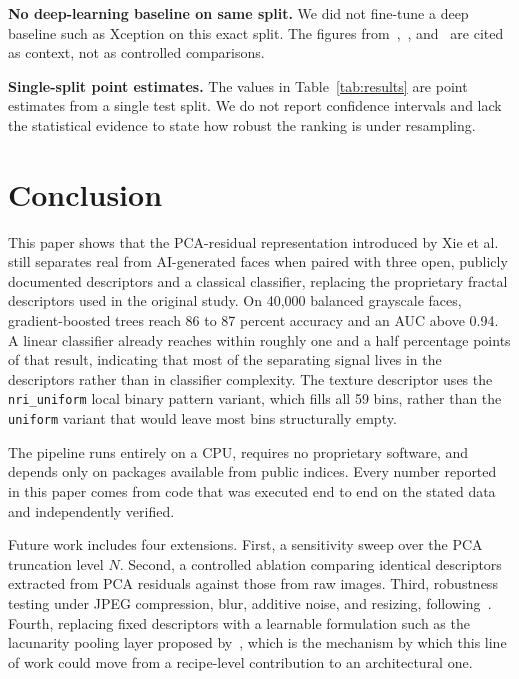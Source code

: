 \documentclass[runningheads]{llncs}
\begin{document}
\textbf{No deep-learning baseline on same split.} We did not fine-tune a deep baseline such as Xception on this exact split. The figures from~\cite{rossler2019},~\cite{yasir2025}, and~\cite{nirob2026} are cited as context, not as controlled comparisons.

\textbf{Single-split point estimates.} The values in Table~\ref{tab:results} are point estimates from a single test split. We do not report confidence intervals and lack the statistical evidence to state how robust the ranking is under resampling.


\section{Conclusion}

This paper shows that the PCA-residual representation introduced by Xie et al.~\cite{xie2026} still separates real from AI-generated faces when paired with three open, publicly documented descriptors and a classical classifier, replacing the proprietary fractal descriptors used in the original study. On 40,000 balanced grayscale faces, gradient-boosted trees reach 86 to 87 percent accuracy and an AUC above 0.94. A linear classifier already reaches within roughly one and a half percentage points of that result, indicating that most of the separating signal lives in the descriptors rather than in classifier complexity. The texture descriptor uses the \texttt{nri\_uniform} local binary pattern variant, which fills all 59 bins, rather than the \texttt{uniform} variant that would leave most bins structurally empty.

The pipeline runs entirely on a CPU, requires no proprietary software, and depends only on packages available from public indices. Every number reported in this paper comes from code that was executed end to end on the stated data and independently verified.

Future work includes four extensions. First, a sensitivity sweep over the PCA truncation level $N$. Second, a controlled ablation comparing identical descriptors extracted from PCA residuals against those from raw images. Third, robustness testing under JPEG compression, blur, additive noise, and resizing, following~\cite{giudice2021}. Fourth, replacing fixed descriptors with a learnable formulation such as the lacunarity pooling layer proposed by~\cite{mohan2024}, which is the mechanism by which this line of work could move from a recipe-level contribution to an architectural one.
\end{document}
